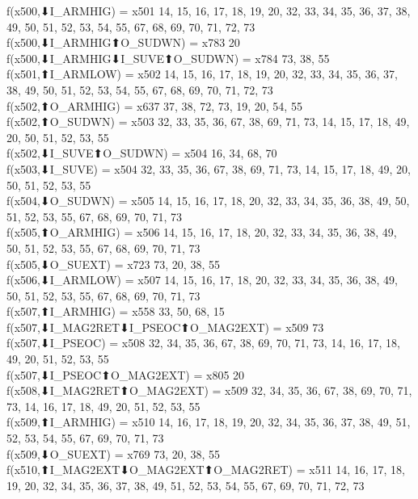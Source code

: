f(x500,⬇I_ARMHIG) = x501 {14, 15, 16, 17, 18, 19, 20, 32, 33, 34, 35, 36, 37, 38, 49, 50, 51, 52, 53, 54, 55, 67, 68, 69, 70, 71, 72, 73} \\
f(x500,⬇I_ARMHIG⬆O_SUDWN) = x783 {20} \\
f(x500,⬇I_ARMHIG⬇I_SUVE⬆O_SUDWN) = x784 {73, 38, 55} \\
f(x501,⬆I_ARMLOW) = x502 {14, 15, 16, 17, 18, 19, 20, 32, 33, 34, 35, 36, 37, 38, 49, 50, 51, 52, 53, 54, 55, 67, 68, 69, 70, 71, 72, 73} \\
f(x502,⬆O_ARMHIG) = x637 {37, 38, 72, 73, 19, 20, 54, 55} \\
f(x502,⬆O_SUDWN) = x503 {32, 33, 35, 36, 67, 38, 69, 71, 73, 14, 15, 17, 18, 49, 20, 50, 51, 52, 53, 55} \\
f(x502,⬇I_SUVE⬆O_SUDWN) = x504 {16, 34, 68, 70} \\
f(x503,⬇I_SUVE) = x504 {32, 33, 35, 36, 67, 38, 69, 71, 73, 14, 15, 17, 18, 49, 20, 50, 51, 52, 53, 55} \\
f(x504,⬇O_SUDWN) = x505 {14, 15, 16, 17, 18, 20, 32, 33, 34, 35, 36, 38, 49, 50, 51, 52, 53, 55, 67, 68, 69, 70, 71, 73} \\
f(x505,⬆O_ARMHIG) = x506 {14, 15, 16, 17, 18, 20, 32, 33, 34, 35, 36, 38, 49, 50, 51, 52, 53, 55, 67, 68, 69, 70, 71, 73} \\
f(x505,⬇O_SUEXT) = x723 {73, 20, 38, 55} \\
f(x506,⬇I_ARMLOW) = x507 {14, 15, 16, 17, 18, 20, 32, 33, 34, 35, 36, 38, 49, 50, 51, 52, 53, 55, 67, 68, 69, 70, 71, 73} \\
f(x507,⬆I_ARMHIG) = x558 {33, 50, 68, 15} \\
f(x507,⬇I_MAG2RET⬇I_PSEOC⬆O_MAG2EXT) = x509 {73} \\
f(x507,⬇I_PSEOC) = x508 {32, 34, 35, 36, 67, 38, 69, 70, 71, 73, 14, 16, 17, 18, 49, 20, 51, 52, 53, 55} \\
f(x507,⬇I_PSEOC⬆O_MAG2EXT) = x805 {20} \\
f(x508,⬇I_MAG2RET⬆O_MAG2EXT) = x509 {32, 34, 35, 36, 67, 38, 69, 70, 71, 73, 14, 16, 17, 18, 49, 20, 51, 52, 53, 55} \\
f(x509,⬆I_ARMHIG) = x510 {14, 16, 17, 18, 19, 20, 32, 34, 35, 36, 37, 38, 49, 51, 52, 53, 54, 55, 67, 69, 70, 71, 73} \\
f(x509,⬇O_SUEXT) = x769 {73, 20, 38, 55} \\
f(x510,⬆I_MAG2EXT⬇O_MAG2EXT⬆O_MAG2RET) = x511 {14, 16, 17, 18, 19, 20, 32, 34, 35, 36, 37, 38, 49, 51, 52, 53, 54, 55, 67, 69, 70, 71, 72, 73} \\
